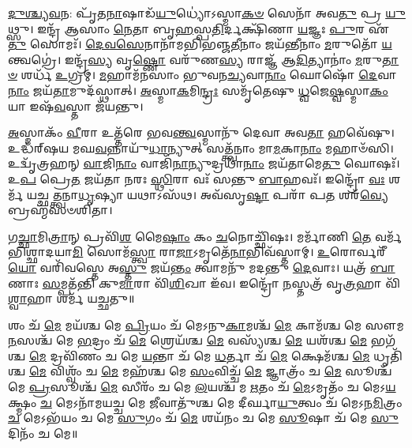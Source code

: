 \-\ul{𑌦𑍁}\-\-\ul{𑌶𑍍𑌚𑍍𑌯}\-\-\ul{𑌵}\-𑌨: 𑌪𑍃᳴𑌤\-\ul{𑌨𑌾}\-𑌷𑌾𑌡᳴\-\ul{𑌯𑍁}\-𑌧𑍍𑌯𑍋॑𑌽𑌸𑍍𑌮𑌾\-\ul{𑌕}\-\-\ul{𑍞} 𑌸𑍇𑌨𑌾᳴ 𑌅𑌵\-\ul{𑌤𑍁} 𑌪𑍍𑌰 \ul{𑌯𑍁}\-𑌥𑍍𑌸𑍁। 𑌇𑌨𑍍𑌦𑍍𑌰᳴ 𑌆𑌸𑌾𑌂 \ul{𑌨𑍇}\-𑌤𑌾 𑌬𑍃\-\ul{𑌹}\-𑌸𑍍𑌪\-\ul{𑌤𑌿}\-𑌰𑍍𑌦𑌕𑍍𑌷𑌿᳴𑌣𑌾 \ul{𑌯}\-𑌜𑍍𑌞𑌃 \ul{𑌪𑍁}\-𑌰 𑌏᳴\-\ul{𑌤𑍁} 𑌸𑍋𑌮𑌃᳴। \ul{𑌦𑍇}\-\-\ul{𑌵}\-\-\ul{𑌸𑍇}\-𑌨𑌾𑌨𑌾᳴𑌮𑌭𑌿𑌭𑌞𑍍𑌜\-\ul{𑌤𑍀}\-𑌨𑌾𑌂 𑌜𑌯᳴𑌨𑍍𑌤𑍀𑌨𑌾𑌂 \ul{𑌮}\-𑌰𑍁𑌤𑍋᳴ \ul{𑌯}\-𑌨𑍍𑌤𑍍𑌵𑌗𑍍𑌰𑍇॑। 𑌇𑌨𑍍𑌦𑍍𑌰᳴\-\ul{𑌸𑍍𑌯} 𑌵𑍃\-\ul{𑌷𑍍𑌣𑍋} 𑌵𑌰𑍁᳴𑌣\-\ul{𑌸𑍍𑌯} 𑌰𑌾𑌜𑍍𑌞᳴ 𑌆\-\ul{𑌦𑌿}\-𑌤𑍍𑌯𑌾𑌨𑌾𑌂॑ \ul{𑌮}\-𑌰𑍁\-\ul{𑌤𑌾}\-\-\ul{𑍞} 𑌶𑌰𑍍𑌧᳴ \ul{𑌉}\-𑌗𑍍𑌰𑌮𑍍। \ul{𑌮}\-𑌹𑌾𑌮᳴𑌨𑌸𑌾𑌂 𑌭𑍁𑌵𑌨\-\ul{𑌚𑍍𑌯}\-𑌵𑌾\-\ul{𑌨𑌾𑌂} 𑌘𑍋𑌷𑍋᳴ \ul{𑌦𑍇}\-𑌵𑌾\-\ul{𑌨𑌾𑌂} 𑌜𑌯᳴\-\ul{𑌤𑌾}\-𑌮𑍁𑌦᳴𑌸𑍍𑌥𑌾𑌤𑍍। \ul{𑌅}\-𑌸𑍍𑌮𑌾\-\ul{𑌕}\-𑌮𑌿\-\ul{𑌨𑍍𑌦𑍍𑌰𑌃} 𑌸𑌮𑍃᳴𑌤𑍇𑌷𑍁 \ul{𑌧𑍍𑌵}\-𑌜𑍇\-\ul{𑌷𑍍𑌵}\-𑌸𑍍𑌮𑌾\-\ul{𑌕𑌂} 𑌯𑌾 𑌇𑌷᳴\-\ul{𑌵}\-𑌸𑍍𑌤𑌾 𑌜᳴𑌯𑌨𑍍𑌤𑍁।

\-\ul{𑌅}\-𑌸𑍍𑌮𑌾𑌕𑌂᳴ \ul{𑌵𑍀}\-𑌰𑌾 𑌉𑌤𑍍𑌤᳴𑌰𑍇 𑌭𑌵\-\ul{𑌨𑍍𑌤𑍍𑌵}\-𑌸𑍍𑌮𑌾𑌨𑍁᳴ 𑌦𑍇𑌵𑌾 𑌅𑌵\-\ul{𑌤𑌾} 𑌹𑌵𑍇᳴𑌷𑍁। 𑌉𑌦𑍍𑌧᳴𑌰𑍍‌𑌷𑌯 𑌮𑌘\-\ul{𑌵}\-𑌨𑍍𑌨𑌾𑌯𑍁᳴\-\ul{𑌧𑌾}\-𑌨𑍍𑌯𑍁𑌤𑍍 𑌸𑌤𑍍𑌤𑍍𑌵᳴𑌨𑌾𑌂 𑌮𑌾\-\ul{𑌮}\-𑌕𑌾\-\ul{𑌨𑌾𑌂} 𑌮𑌹𑌾𑍞᳴𑌸𑌿। 𑌉𑌦𑍍𑌵𑍃᳴𑌤𑍍𑌰𑌹𑌨𑍍 \ul{𑌵𑌾}\-𑌜𑌿\-\ul{𑌨𑌾𑌂} 𑌵𑌾𑌜𑌿᳴\-\ul{𑌨𑌾}\-𑌨𑍍𑌯𑍁𑌦𑍍𑌰𑌥𑌾᳴\-\ul{𑌨𑌾𑌂} 𑌜𑌯᳴𑌤𑌾𑌮𑍇\-\ul{𑌤𑍁} 𑌘𑍋𑌷𑌃᳴। 𑌉\-\ul{𑌪} 𑌪𑍍𑌰𑍇\-\ul{𑌤} 𑌜𑌯᳴𑌤𑌾 𑌨𑌰𑌃 \ul{𑌸𑍍𑌥𑌿}\-𑌰𑌾 𑌵𑌃᳴ 𑌸𑌨𑍍𑌤𑍁 \ul{𑌬𑌾}\-𑌹𑌵𑌃᳴। 𑌇𑌨𑍍𑌦𑍍𑌰𑍋᳴ \ul{𑌵𑌃} 𑌶𑌰𑍍𑌮᳴ 𑌯𑌚𑍍𑌛𑌤𑍍𑌤𑍍𑌵𑌨𑌾\-\ul{𑌧𑍃}\-𑌷𑍍𑌯𑌾 𑌯𑌥𑌾𑌽𑌸᳴𑌥। 𑌅𑌵᳴𑌸𑍃\-\ul{𑌷𑍍𑌟𑌾} 𑌪𑌰𑌾᳴ 𑌪\-\ul{𑌤} 𑌶𑌰᳴\-\ul{𑌵𑍍𑌯𑍇} 𑌬𑍍𑌰𑌹𑍍𑌮᳴𑌸𑍞𑌶𑌿𑌤𑌾।

𑌗\-\ul{𑌚𑍍𑌛𑌾}\-𑌮𑌿\-\ul{𑌤𑍍𑌰𑌾}\-𑌨𑍍 𑌪𑍍𑌰𑌵𑌿᳴\-\ul{𑌶} 𑌮𑍈\-\ul{𑌷𑌾𑌂} 𑌕𑌂 \ul{𑌚}\-𑌨𑍋𑌚𑍍𑌛𑌿᳴𑌷𑌃। 𑌮𑌰𑍍𑌮𑌾᳴𑌣𑌿 \ul{𑌤𑍇} 𑌵𑌰𑍍𑌮᳴𑌭𑌿𑌶𑍍𑌛𑌾𑌦𑌯𑌾\-\ul{𑌮𑌿} 𑌸𑍋𑌮᳴\-\ul{𑌸𑍍𑌤𑍍𑌵𑌾} 𑌰𑌾\-\ul{𑌜𑌾}\-𑌽𑌮𑍃𑌤𑍇᳴\-\ul{𑌨𑌾}\-𑌭𑌿𑌵᳴𑌸𑍍𑌤𑌾𑌮𑍍। \ul{𑌉}\-𑌰𑍋𑌰𑍍𑌵𑌰𑍀᳴\-\ul{𑌯𑍋} 𑌵𑌰𑌿᳴𑌵𑌸𑍍𑌤𑍇 𑌅\-\ul{𑌸𑍍𑌤𑍁} 𑌜𑌯᳴\-\ul{𑌨𑍍𑌤𑌂} 𑌤𑍍𑌵𑌾𑌮𑌨𑍁᳴ 𑌮𑌦𑌨𑍍𑌤𑍁 \ul{𑌦𑍇}\-𑌵𑌾𑌃। 𑌯𑌤𑍍𑌰᳴ \ul{𑌬𑌾}\-𑌣𑌾𑌃 \ul{𑌸}\-𑌮𑍍𑌪𑌤᳴𑌨𑍍𑌤𑌿 𑌕𑍁\-\ul{𑌮𑌾}\-𑌰𑌾 𑌵𑌿᳴\-\ul{𑌶𑌿}\-𑌖𑌾 𑌇᳴𑌵। 𑌇𑌨𑍍𑌦𑍍𑌰𑍋᳴ \ul{𑌨}\-𑌸𑍍𑌤𑌤𑍍𑌰᳴ 𑌵𑍃\-\ul{𑌤𑍍𑌰}\-𑌹𑌾 𑌵𑌿᳴\-\ul{𑌶𑍍𑌵𑌾}\-𑌹𑌾 𑌶𑌰𑍍𑌮᳴ 𑌯𑌚𑍍𑌛𑌤𑍁॥

𑌶𑌂 𑌚᳴ \ul{𑌮𑍇} 𑌮𑌯᳴𑌶𑍍𑌚 𑌮𑍇 \ul{𑌪𑍍𑌰𑌿}\-𑌯𑌂 𑌚᳴ 𑌮𑍇𑌽𑌨𑍁\-\ul{𑌕𑌾}\-𑌮𑌶𑍍𑌚᳴ \ul{𑌮𑍇} 𑌕𑌾𑌮᳴𑌶𑍍𑌚 𑌮𑍇 𑌸𑍗𑌮\-\ul{𑌨}\-𑌸𑌶𑍍𑌚᳴ 𑌮𑍇 \ul{𑌭}\-𑌦𑍍𑌰𑌂 𑌚᳴ \ul{𑌮𑍇} 𑌶𑍍𑌰𑍇𑌯᳴𑌶𑍍𑌚 \ul{𑌮𑍇} 𑌵𑌸𑍍𑌯᳴𑌶𑍍𑌚 \ul{𑌮𑍇} 𑌯𑌶᳴𑌶𑍍𑌚 \ul{𑌮𑍇} 𑌭𑌗᳴𑌶𑍍𑌚 \ul{𑌮𑍇} 𑌦𑍍𑌰𑌵𑌿᳴𑌣𑌂 𑌚 𑌮𑍇 \ul{𑌯}\-𑌨𑍍𑌤𑌾 𑌚᳴ 𑌮𑍇 \ul{𑌧}\-𑌰𑍍𑌤𑌾 𑌚᳴ \ul{𑌮𑍇} 𑌕𑍍𑌷𑍇𑌮᳴𑌶𑍍𑌚 \ul{𑌮𑍇} 𑌧𑍃𑌤𑌿᳴𑌶𑍍𑌚 \ul{𑌮𑍇} 𑌵𑌿𑌶𑍍𑌵𑌂᳴ 𑌚 \ul{𑌮𑍇} 𑌮𑌹᳴𑌶𑍍𑌚 𑌮𑍇 \ul{𑌸𑌂}\-𑌵𑌿𑌚𑍍𑌚᳴ \ul{𑌮𑍇} 𑌜𑍍𑌞𑌾𑌤𑍍𑌰𑌂᳴ 𑌚 \ul{𑌮𑍇} 𑌸𑍂𑌶𑍍𑌚᳴ 𑌮𑍇 \ul{𑌪𑍍𑌰}\-𑌸𑍂𑌶𑍍𑌚᳴ \ul{𑌮𑍇} 𑌸𑍀𑌰𑌂᳴ 𑌚 𑌮𑍇 \ul{𑌲}\-𑌯𑌶𑍍𑌚᳴ 𑌮 \ul{𑌋}\-𑌤𑌂 𑌚᳴ \ul{𑌮𑍇}\-𑌽𑌮𑍃𑌤𑌂᳴ 𑌚 𑌮𑍇𑌽\-\ul{𑌯}\-𑌕𑍍𑌷𑍍𑌮𑌂 \ul{𑌚} 𑌮𑍇𑌽𑌨𑌾᳴𑌮𑌯𑌚𑍍𑌚 𑌮𑍇 \ul{𑌜𑍀}\-𑌵𑌾𑌤𑍁᳴𑌶𑍍𑌚 𑌮𑍇 𑌦𑍀𑌰𑍍𑌘𑌾\-\ul{𑌯𑍁}\-𑌤𑍍𑌵𑌂 𑌚᳴ 𑌮𑍇𑌽𑌨\-\ul{𑌮𑌿}\-𑌤𑍍𑌰𑌂 \ul{𑌚} 𑌮𑍇𑌽𑌭᳴𑌯𑌂 𑌚 𑌮𑍇 \ul{𑌸𑍁}\-𑌗𑌂 𑌚᳴ \ul{𑌮𑍇} 𑌶𑌯᳴𑌨𑌂 𑌚 𑌮𑍇 \ul{𑌸𑍂}\-𑌷𑌾 𑌚᳴ 𑌮𑍇 \ul{𑌸𑍁}\-𑌦𑌿𑌨𑌂᳴ 𑌚 𑌮𑍇॥

